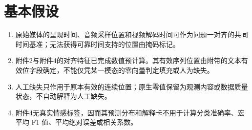 \section*{基本假设}
\begin{enumerate}[leftmargin=2.5em,itemsep=0pt]
  \item 原始媒体的呈现时间、音频采样位置和视频解码时间可作为问题一对齐的共同时间基准；无法获得可靠时间支持的位置由掩码标记。
  \item 附件2与附件4的对齐特征已完成数值预计算。其有效序列位置由附带的文本有效位字段确定，不能仅凭某一模态的零向量判定填充或人为缺失。
  \item 人工缺失只作用于原本有效的连续位置；原生零值保留为观测内容或数据质量状态，不自动解释为人工缺失。
  \item 附件4无真实情感标签，因而其预测分布和解释卡不用于计算分类准确率、宏平均 F1 值、平均绝对误差或相关系数。
\end{enumerate}
